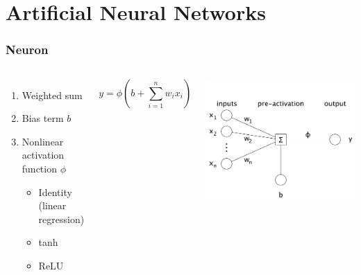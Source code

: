\documentclass[aspectratio=169]{beamer}
\begin{document}
\section{Artificial Neural Networks}
\begin{frame}
	\frametitle{Neuron}
	\begin{columns}
		\begin{enumerate}
			\item Weighted sum
			\item Bias term \(b\)
			\item Nonlinear activation function \(\phi\)
			      \begin{itemize}
				      \item Identity (linear regression)
				      \item tanh
				      \item ReLU
			      \end{itemize}
		\end{enumerate}
		\[ y = \phi\left(b + \sum_{i=1}^n w_i x_i\right) \]

		\includegraphics[width=\linewidth]{neuron.pdf}
	\end{columns}
\end{frame}
\end{document}
